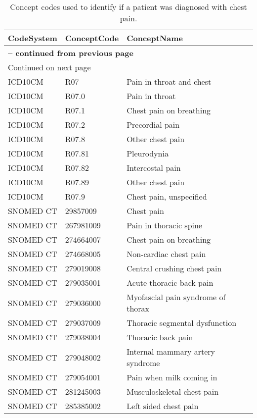 \begin{longtable}{p{}p{}p{}}
\caption{Concept codes used to identify if a patient was diagnosed with chest pain.} \\ 
 CodeSystem & ConceptCode & ConceptName \\ 
  \hline 
\endfirsthead 
\multicolumn{3}{p{\textwidth}}{{ \bfseries \tablename \thetable{} -- continued from previous page}} \ 
\hline CodeSystem & ConceptCode & ConceptName \\ \hline 
\endhead 
\hline \multicolumn{3}{p{\textwidth}}{{Continued on next page}} \\ \hline 
\endfoot 
\hline 
\endlastfoot 
 \hline
ICD10CM & R07 & Pain in throat and chest \\ 
  ICD10CM & R07.0 & Pain in throat \\ 
  ICD10CM & R07.1 & Chest pain on breathing \\ 
  ICD10CM & R07.2 & Precordial pain \\ 
  ICD10CM & R07.8 & Other chest pain \\ 
  ICD10CM & R07.81 & Pleurodynia \\ 
  ICD10CM & R07.82 & Intercostal pain \\ 
  ICD10CM & R07.89 & Other chest pain \\ 
  ICD10CM & R07.9 & Chest pain, unspecified \\ 
  SNOMED CT & 29857009 & Chest pain \\ 
  SNOMED CT & 267981009 & Pain in thoracic spine \\ 
  SNOMED CT & 274664007 & Chest pain on breathing \\ 
  SNOMED CT & 274668005 & Non-cardiac chest pain \\ 
  SNOMED CT & 279019008 & Central crushing chest pain \\ 
  SNOMED CT & 279035001 & Acute thoracic back pain \\ 
  SNOMED CT & 279036000 & Myofascial pain syndrome of thorax \\ 
  SNOMED CT & 279037009 & Thoracic segmental dysfunction \\ 
  SNOMED CT & 279038004 & Thoracic back pain \\ 
  SNOMED CT & 279048002 & Internal mammary artery syndrome \\ 
  SNOMED CT & 279054001 & Pain when milk coming in \\ 
  SNOMED CT & 281245003 & Musculoskeletal chest pain \\ 
  SNOMED CT & 285385002 & Left sided chest pain \\ 

\end{longtable}
